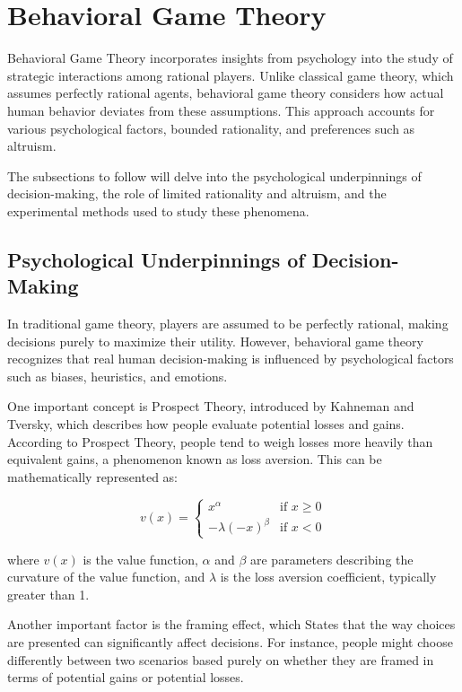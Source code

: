 \documentclass[12pt]{book} %
\begin{document}
\section{Behavioral Game Theory}
Behavioral Game Theory incorporates insights from psychology into the study of strategic interactions among rational players. Unlike classical game theory, which assumes perfectly rational agents, behavioral game theory considers how actual human behavior deviates from these assumptions. This approach accounts for various psychological factors, bounded rationality, and preferences such as altruism.

The subsections to follow will delve into the psychological underpinnings of decision-making, the role of limited rationality and altruism, and the experimental methods used to study these phenomena.

\subsection{Psychological Underpinnings of Decision-Making}
In traditional game theory, players are assumed to be perfectly rational, making decisions purely to maximize their utility. However, behavioral game theory recognizes that real human decision-making is influenced by psychological factors such as biases, heuristics, and emotions.

One important concept is Prospect Theory, introduced by Kahneman and Tversky, which describes how people evaluate potential losses and gains. According to Prospect Theory, people tend to weigh losses more heavily than equivalent gains, a phenomenon known as loss aversion. This can be mathematically represented as:

\[
v(x) = \begin{cases} 
x^\alpha & \text{if } x \geq 0 \\
-\lambda (-x)^\beta & \text{if } x < 0
\end{cases}
\]

where \( v(x) \) is the value function, \( \alpha \) and \( \beta \) are parameters describing the curvature of the value function, and \( \lambda \) is the loss aversion coefficient, typically greater than 1.

Another important factor is the framing effect, which States that the way choices are presented can significantly affect decisions. For instance, people might choose differently between two scenarios based purely on whether they are framed in terms of potential gains or potential losses.
\end{document}
